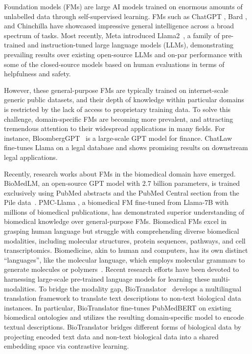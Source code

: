 \documentclass{article}
\begin{document}
Foundation models (FMs) are large AI models trained on enormous amounts of unlabelled data through self-supervised learning. FMs such as ChatGPT \citep{chatgpt}, Bard \citep{bard}, and Chinchilla \citep{Hoffmann2022TrainingCL} have showcased impressive general intelligence across a broad spectrum of tasks. Most recently, Meta introduced Llama2~\citep{Touvron2023Llama2O}, a family of pre-trained and instruction-tuned large language models (LLMs), demonstrating prevailing results over existing open-source LLMs and on-par performance with some of the closed-source models based on human evaluations in terms of helpfulness and safety. 

However, these general-purpose FMs are typically trained on internet-scale generic public datasets, and their depth of knowledge within particular domains is restricted by the lack of access to proprietary training data. To solve this challenge, domain-specific FMs are becoming more prevalent, and attracting tremendous attention to their widespread applications in many fields. For instance, BloombergGPT~\citep{bloomberggPT} is a large-scale GPT model for finance. ChatLaw~\citep{cui2023chatlaw} fine-tunes Llama on a legal database and shows promising results on downstream legal applications.

Recently, research works about FMs in the biomedical domain have emerged. BioMedLM, an open-source GPT model with 2.7 billion parameters, is trained exclusively using PubMed abstracts and the PubMed Central section from the Pile data~\citep{gao2020pile}. PMC-Llama \citep{pmc}, a biomedical FM fine-tuned from Llama-7B with millions of biomedical publications, has demonstrated superior understanding of biomedical knowledge over general-purpose FMs. Biomedical FMs excel in grasping human language but struggle with comprehending diverse biomedical modalities, including molecular structures, protein sequences, pathways, and cell transcriptomics. Biomedicine, akin to human and computers, has its own distinct ``languages'', like the molecular language, which employs molecular grammars to generate molecules or polymers~\citep{pmlr-v202-guo23h}. Recent research efforts have been devoted to harnessing large-scale pre-trained language models for learning these multi-modalities. To bridge the modality gap, BioTranslator~\citep{Xu2023} develops a multilingual translation framework to translate text descriptions to non-text biological data instances. In particular, BioTranslator fine-tunes PubMedBERT \citep{pubmedbert} on existing biomedical ontologies and utilizes the resulting domain-specific model to encode textual descriptions. BioTranslator bridges different forms of biological data by projecting encoded text data and non-text biological data into a shared embedding space via contrastive learning. 
\end{document}
